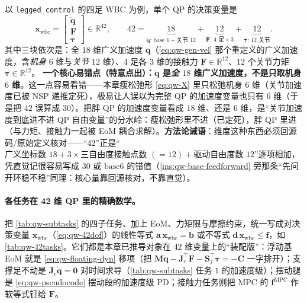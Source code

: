\begin{insight}[完整 WBC QP 的精确决策变量——$42=\ddot{\boldsymbol{q}}(18)+\boldsymbol{F}(12)+\boldsymbol{\tau}(12)$]\label{ins:qw-42dof}
以 \texttt{legged\_control} 的四足 WBC 为例，单个 QP 的决策变量是
\begin{equation}
  \boldsymbol{x}_{\mathrm{wbc}}=\begin{bmatrix}\ddot{\boldsymbol{q}}\\\boldsymbol{F}\\\boldsymbol{\tau}\end{bmatrix}
  \in\mathbb{R}^{42},\qquad
  42=\underbrace{18}_{\ddot{\boldsymbol{q}}:\,\text{base }6+\text{关节 }12}+\underbrace{12}_{\boldsymbol{F}:\,4\text{ 足}\times3}+\underbrace{12}_{\boldsymbol{\tau}:\,12\text{ 关节}}.
  \label{eq:qw-42dof}
\end{equation}
其中三块依次是：全 $18$ 维广义加速度 $\ddot{\boldsymbol{q}}$（\cref{eq:qw-gen-vel} 那个重定义的广义加速度，含\emph{机身} $6$ 维与\emph{关节} $12$ 维）、$4$ 足各 $3$ 维的接触力 $\boldsymbol{F}\in\mathbb{R}^{12}$、$12$ 个关节力矩 $\boldsymbol{\tau}\in\mathbb{R}^{12}$。
\textbf{一个核心易错点（特意点出）：$\ddot{\boldsymbol{q}}$ 是\emph{全} $18$ 维广义加速度，不是只取机身 $6$ 维}。这一点容易看错——本章瘦松弛形 \cref{eq:qw-X} 里只松弛机身 $6$ 维（关节加速度已被 NSP 递推定死），极易让人误以为完整 QP 的加速度变量也只有 $6$ 维（于是把 $42$ 误算成 $30$）。把胖 QP 的加速度变量看成 $18$ 维、还是 $6$ 维，是“关节加速度到底进不进 QP 自由变量”的分水岭：瘦松弛形里不进（已定死），胖 QP 里进（与力矩、接触力一起被 EoM 耦合求解）。\textbf{方法论诫语}：维度这种东西必须回源码/原始定义核对——“$42$”正是“$\text{广义坐标数 }18+3\times\text{三自由度接触点数 }(=12)+\text{驱动自由度数 }12$”逐项相加，凭直觉记很容易写成 $30$ 或 $\text{base}6$ 的错值（\cref{ins:qw-base-feedforward} 旁那条“先问开环稳不稳”同理：核心量靠回源核对，不靠直觉）。
\end{insight}

\paragraph{各任务在 42 维 QP 里的精确数学。}
把 \cref{tab:qw-subtasks} 的四子任务、加上 EoM、力矩限与摩擦约束，统一写成对决策变量 $\boldsymbol{x}_{\mathrm{wbc}}$（\cref{eq:qw-42dof}）的线性等式 $\boldsymbol{a}\,\boldsymbol{x}_{\mathrm{wbc}}=\boldsymbol{b}$ 或不等式 $\boldsymbol{d}\,\boldsymbol{x}_{\mathrm{wbc}}\le\boldsymbol{f}$，如 \cref{tab:qw-42tasks}。它们都是本章已推导对象在 $42$ 维变量上的“装配版”：浮动基 EoM 就是 \cref{eq:qw-floating-dyn} 移项（把 $\boldsymbol{M}\ddot{\boldsymbol{q}}-\boldsymbol{J}_c^\top\boldsymbol{F}-\boldsymbol{S}_j^\top\boldsymbol{\tau}=-\boldsymbol{C}$ 一字排开）；支撑足不动是 $\boldsymbol{J}_c\dot{\boldsymbol{q}}=\mathbf{0}$ 对时间求导（\cref{tab:qw-subtasks} 任务 $1$ 的加速度级）；摆动腿是 \cref{eq:qw-pseudocode} 摆动段的加速度级 PD；接触力任务则把 MPC 的 $\boldsymbol{f}^{\mathrm{MPC}}$ 作软等式钉给 $\boldsymbol{F}$。

